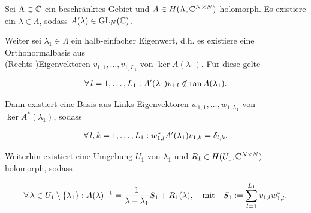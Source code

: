 \begin{theorem} \label{keldysh_nicht_linear}

    Sei $\Lambda \subset \mathbb{C}$ ein beschränktes Gebiet und $A \in H(\Lambda, \mathbb{C}^{N \times N})$ holomorph.
    Es existiere ein $\lambda \in \Lambda$, sodass $A(\lambda) \in \operatorname{GL}_N(\mathbb{C})$.

    Weiter sei $\lambda_1 \in \Lambda$ ein halb-einfacher Eigenwert, d.h. es existiere eine Orthonormalbasis aus \\ (Rechts-)Eigenvektoren $v_{1, 1}, \dots, v_{1, L_1}$ von $\ker A(\lambda_1)$.
    Für diese gelte

    \begin{align*}
        \forall \, l = 1, \dots, L_1:
            A^\prime(\lambda_1) v_{1, l}
            \not \in
            \operatorname{ran} A(\lambda_1).
    \end{align*}

    Dann existiert eine Basis aus Links-Eigenvektoren $w_{1, 1}, \dots, w_{1, L_1}$ von $\ker A^\ast(\lambda_1)$, sodass

    \begin{align}
        \forall \, l, k = 1, \dots, L_1:
            w_{1, l}^\ast A^\prime(\lambda_1) v_{1, k} = \delta_{l, k}.
    \end{align}

    Weiterhin existiert eine Umgebung $U_1$ von $\lambda_1$ und $R_1 \in H(U_1, \mathbb{C}^{N \times N})$ holomorph, sodass

    \begin{align} \label{eq:darstellung_nicht_linear}
        \forall \, \lambda \in U_1 \setminus {\left \{ \lambda_1 \right \}}:
            A(\lambda)^{-1}
            =
            \frac{1}{\lambda - \lambda_1} S_1
            +
            R_1(\lambda),
            \quad
            \text{mit}
            \quad
            S_1
            :=
            \sum_{l=1}^{L_1}
                v_{1, l} w_{1, l}^\ast.
    \end{align}

\end{theorem}
